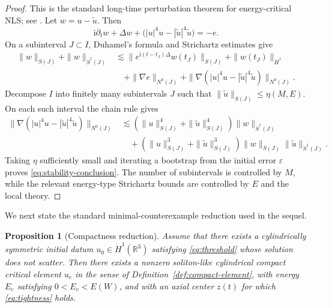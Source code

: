 \documentclass[preprint,12pt]{elsarticle}
\numberwithin{equation}{section}
\newcommand{\R}{\mathbb R}
\newcommand{\ii}{\mathrm i}
\newcommand{\eps}{\varepsilon}
\newcommand{\na}{\nabla}
\newcommand{\pa}{\partial}
\newtheorem{proposition}[theorem]{Proposition}
\theoremstyle{remark}
\begin{document}
\begin{proof}
This is the standard long-time perturbation theorem for energy-critical NLS; see \cite{KenigMerle2006,CollianderKeelStaffilaniTakaokaTao2008,Tao2006}.  Let $w=u-\widetilde u$.  Then
\[
  \ii\pa_t w+\Delta w+
  \bigl(|u|^4u-|\widetilde u|^4\widetilde u\bigr)=-e.
\]
On a subinterval $J\subset I$, Duhamel's formula and Strichartz estimates give
\begin{align*}
  \|w\|_{S(J)}+\|w\|_{\dot S^1(J)}
  &\lesssim \|e^{\ii(t-t_J)\Delta}w(t_J)\|_{S(J)}
       +\|w(t_J)\|_{\dot H^1} \\
  &\quad +\|\na e\|_{N^0(J)}
       +\|\na(|u|^4u-|\widetilde u|^4\widetilde u)\|_{N^0(J)}.
\end{align*}
Decompose $I$ into finitely many subintervals $J$ such that $\|\widetilde u\|_{S(J)}\le\eta(M,E)$.  On each such interval the chain rule gives
\begin{align*}
  \|\na(|u|^4u-|\widetilde u|^4\widetilde u)\|_{N^0(J)}
  &\lesssim
  (\|u\|_{S(J)}^4+\|\widetilde u\|_{S(J)}^4)\|w\|_{\dot S^1(J)} \\
  &\quad +(\|u\|_{S(J)}^3+\|\widetilde u\|_{S(J)}^3)
     \|w\|_{S(J)}\|\widetilde u\|_{\dot S^1(J)}.
\end{align*}
Taking $\eta$ sufficiently small and iterating a bootstrap from the initial error $\eps$ proves \eqref{eq:stability-conclusion}.  The number of subintervals is controlled by $M$, while the relevant energy-type Strichartz bounds are controlled by $E$ and the local theory.
\end{proof}

We next state the standard minimal-counterexample reduction used in the sequel.

\begin{proposition}[Compactness reduction]\label{prop:compactness-reduction}
Assume that there exists a cylindrically symmetric initial datum $u_0\in\dot H^1(\R^3)$ satisfying \eqref{eq:threshold} whose solution does not scatter.  Then there exists a nonzero soliton-like cylindrical compact critical element $u_c$ in the sense of Definition~\ref{def:compact-element}, with energy $E_c$ satisfying $0<E_c<E(W)$, and with an axial center $z(t)$ for which \eqref{eq:tightness} holds.
\end{proposition}
\end{document}
